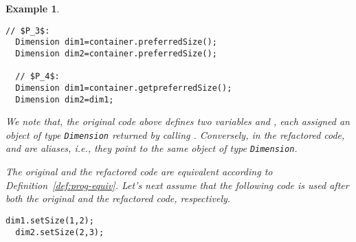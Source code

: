 \documentclass[conference]{IEEEtran}
\newtheorem{example}{Example}
\begin{document}
\begin{example}\label{ex:aliasing}
~\begin{lstlisting}[mathescape=true,showstringspaces=false,numbers=none]
  // $P_3$:
  Dimension dim1=container.preferredSize();
  Dimension dim2=container.preferredSize();    

  // $P_4$:
  Dimension dim1=container.getpreferredSize();  
  Dimension dim2=dim1;
\end{lstlisting}



    




We note that, the original code above defines two variables  and
, each assigned an object of type \lstinline[breaklines=true]{Dimension} returned by calling
.
Conversely, in the refactored code,  and  are aliases,
i.e., they point to the same
object of type \lstinline[breaklines=true]{Dimension}.

The original and the refactored code are equivalent according to Definition~\ref{def:prog-equiv}.
Let's next assume that the following code
is used after both the original and the refactored code, respectively.

\begin{lstlisting}[mathescape=true,showstringspaces=false]
  dim1.setSize(1,2);
  dim2.setSize(2,3);  
\end{lstlisting}


\end{example}
\end{document}
